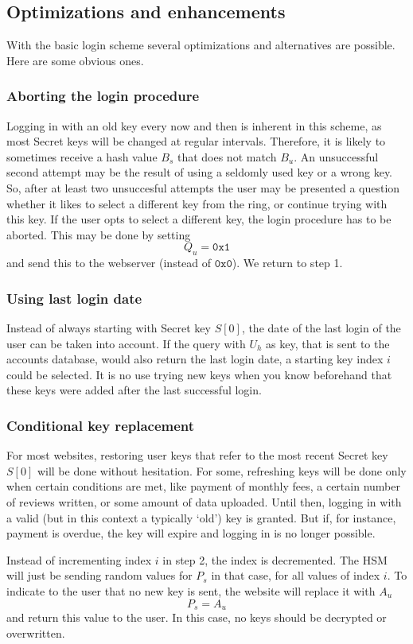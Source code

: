 \subsection{Optimizations and enhancements}
With the basic login scheme several optimizations and alternatives are possible.
Here are some obvious ones.
\subsubsection{Aborting the login procedure}
Logging in with an old key every now and then is inherent in this scheme,
as most Secret keys will be changed at regular intervals.
Therefore,
it is likely to sometimes receive a hash value $B_s$ that does not match $B_u$.
An unsuccessful second attempt may be the result of using a seldomly used key or a wrong key.
So, after at least two unsuccesful attempts
the user may be presented a question whether it likes to select a different key from the ring,
or continue trying with this key.
If the user opts to select a different key, the login procedure has to be aborted.
This may be done by setting
\[Q_u=\mathtt{0x1}\]
and send this to the webserver
(instead of $\mathtt{0x0}$).
We return to step 1.

\subsubsection{Using last login date}
Instead of always starting with Secret key $S[0]$,
the date of the last login of the user can be taken into account.
If the query with $U_h$ as key,
that is sent to the accounts database,
would also return the last login date,
a starting key index $i$ could be selected.
It is no use trying new keys when you know beforehand that these keys were added after the last successful login.

\subsubsection{Conditional key replacement}
\label{sec:conditional_key_replacement}
For most websites, restoring user keys that refer to the most recent Secret key $S[0]$ will be done without hesitation.
For some,
refreshing keys will be done only when certain conditions are met,
like payment of monthly fees,
a certain number of reviews written,
or some amount of data uploaded.
Until then,
logging in with a valid
(but in this context a typically `old')
key is granted.
But if, for instance, payment is overdue, the key will expire and logging in is no longer possible.
\par
Instead of incrementing index $i$ in step 2,
the index is decremented.
The HSM will just be sending random values for $P_s$ in that case, for all values of index $i$.
To indicate to the user that no new key is sent,
the website will replace it with $A_u$
\[P_s = A_u\]
and return this value to the user.
In this case,
no keys should be decrypted or overwritten.

